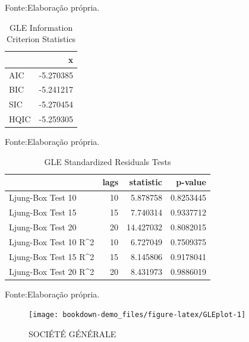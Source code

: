 \documentclass[
  12pt,
  a4paper,
  openany]{book}
\begin{document}
Fonte:Elaboração própria.

\justifying
\bigskip

\begin{table}[!h]

\caption{\label{tab:unnamed-chunk-28}GLE Information Criterion Statistics}
\centering
\begin{tabular}[t]{lr}
\toprule
  & x\\
\midrule
AIC & -5.270385\\
BIC & -5.241217\\
SIC & -5.270454\\
HQIC & -5.259305\\
\bottomrule
\end{tabular}
\end{table}
\FloatBarrier
\centering

Fonte:Elaboração própria.

\justifying
\bigskip

\begin{table}[!h]

\caption{\label{tab:unnamed-chunk-29}GLE Standardized Residuals Tests}
\centering
\begin{tabular}[t]{lrrr}
\toprule
  & lags & statistic & p-value\\
\midrule
Ljung-Box Test 10 & 10 & 5.878758 & 0.8253445\\
Ljung-Box Test 15 & 15 & 7.740314 & 0.9337712\\
Ljung-Box Test 20 & 20 & 14.427032 & 0.8082015\\
Ljung-Box Test 10 R\textasciicircum{}2 & 10 & 6.727049 & 0.7509375\\
Ljung-Box Test 15 R\textasciicircum{}2 & 15 & 8.145806 & 0.9178041\\
\addlinespace
Ljung-Box Test 20 R\textasciicircum{}2 & 20 & 8.431973 & 0.9886019\\
\bottomrule
\end{tabular}
\end{table}
\FloatBarrier
\centering

Fonte:Elaboração própria.

\justifying
\bigskip
\begin{figure}

{\centering \texttt{[image: bookdown-demo\_files/figure-latex/GLEplot-1]} 

}

\caption{SOCIÉTÉ GÉNÉRALE}\label{fig:GLEplot}
\end{figure}
\FloatBarrier
\centering
\end{document}

